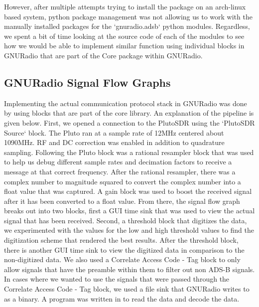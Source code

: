 \documentclass[conference, onecolumn]{IEEEtran}
\begin{document}
However, after multiple attempts trying to install the package on an arch-linux based system, python package management was not allowing us to work with the manually installed packages for the `gnuradio.adsb` python modules. Regardless, we spent a bit of time looking at the source code of each of the modules to see how we would be able to implement similar function using individual blocks in GNURadio that are part of the Core package within GNURadio.

\subsection{GNURadio Signal Flow Graphs}
Implementing the actual communication protocol stack in GNURadio was done by using blocks that are part of the core library. An explanation of the pipeline is given below. First, we opened a connection to the PlutoSDR using the `PlutoSDR Source` block. The Pluto ran at a sample rate of 12MHz centered about 1090MHz. RF and DC correction was enabled in addition to quadrature sampling. Following the Pluto block was a rational resampler block that was used to help us debug different sample rates and decimation factors to receive a message at that correct frequency. After the rational resampler, there was a complex number to magnitude squared to convert the complex number into a float value that was captured. A gain block was used to boost the received signal after it has been converted to a float value. From there, the signal flow graph breaks out into two blocks, first a GUI time sink that was used to view the actual signal that has been received. Second, a threshold block that digitizes the data, we experimented with the values for the low and high threshold values to find the digitization scheme that rendered the best results. After the threshold block, there is another GUI time sink to view the digitized data in comparison to the non-digitized data. We also used a Correlate Access Code - Tag block to only allow signals that have the preamble within them to filter out non ADS-B signals. In cases where we wanted to use the signals that were passed through the Correlate Access Code - Tag block, we used a file sink that GNURadio writes to as a binary. A program was written in to read the data and decode the data.
\end{document}
